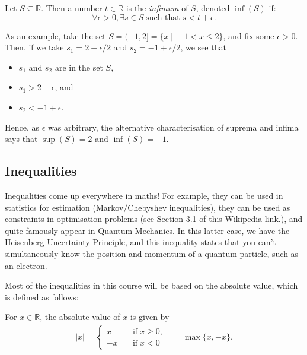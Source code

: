 \documentclass[
  10pt,
  a4paper]{article}
\providecommand{\tightlist}{%
  \setlength{\itemsep}{0pt}\setlength{\parskip}{0pt}}
\theoremstyle{plain}
\theoremstyle{definition}
\theoremstyle{plain}
\theoremstyle{plain}
\theoremstyle{plain}
\theoremstyle{plain}
\theoremstyle{definition}
\theoremstyle{definition}
\theoremstyle{remark}
\theoremstyle{remark}
\let\BeginKnitrBlock\begin \let\EndKnitrBlock\end
\begin{document}
\BeginKnitrBlock{proposition}
{\label{prp:prop2} }Let \(S\subseteq\mathbb{R}\). Then a number \(t\in\mathbb{R}\) is the \emph{infimum} of \(S\), denoted \(\inf(S)\) if: \[\forall \epsilon > 0, \exists s \in S\; \text{such that} \; s < t + \epsilon.\]
\EndKnitrBlock{proposition}
As an example, take the set \(S = (-1,2] = \lbrace x \, \lvert\, -1 < x \leq 2\rbrace\), and fix some \(\epsilon > 0\). Then, if we take \(s_1 = 2 - \epsilon/2\) and \(s_2 = -1 + \epsilon/2\), we see that

\begin{itemize}
\tightlist
\item
  \(s_1\) and \(s_2\) are in the set \(S\),
\item
  \(s_1 > 2 - \epsilon\), and
\item
  \(s_2 < -1 + \epsilon\).
\end{itemize}

Hence, as \(\epsilon\) was arbitrary, the alternative characterisation of suprema and infima says that \(\sup(S) = 2\) and \(\inf(S) = -1\).

\hypertarget{inequalities}{%
\subsection{Inequalities}\label{inequalities}}

Inequalities come up everywhere in maths! For example, they can be used in statistics for estimation (Markov/Chebyshev inequalities), they can be used as constraints in optimisation problems (see Section 3.1 of \href{https://en.wikipedia.org/wiki/Linear_programming}{this Wikipedia link.}), and quite famously appear in Quantum Mechanics. In this latter case, we have the \href{http://hyperphysics.phy-astr.gsu.edu/hbase/uncer.html}{Heisenberg Uncertainty Principle}, and this inequality states that you can't simultaneously know the position and momentum of a quantum particle, such as an electron.

Most of the inequalities in this course will be based on the absolute value, which is defined as follows:
\BeginKnitrBlock{definition}[Absolute Value]
{\label{def:def3} }For \(x \in \mathbb{R}\), the absolute value of \(x\) is given by \begin{align*}
    \lvert x \rvert = \begin{cases}
    x \quad &\text{if} \; x \geq 0,\\
    -x \quad &\text{if} \; x < 0
    \end{cases}\;\; = \max\lbrace x, -x \rbrace.
\end{align*}
\EndKnitrBlock{definition}
\end{document}
